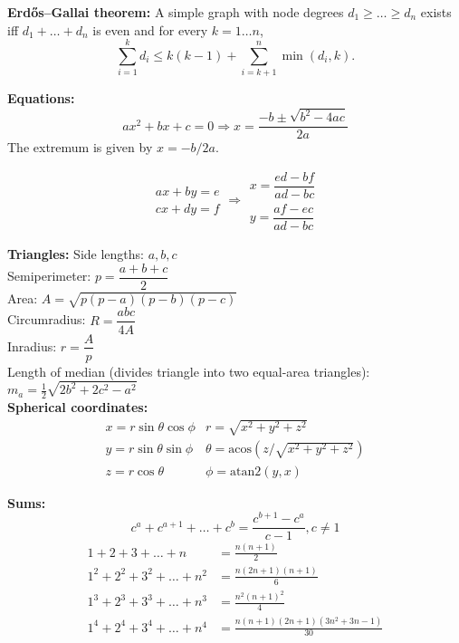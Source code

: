 \noindent
\textbf{Erdős–Gallai theorem:}
\noindent
A simple graph with node degrees $d_1 \ge \dots \ge d_n$ exists iff $d_1 + \dots + d_n$ is even and for every $k = 1\dots n$,
\[ \sum _{i=1}^{k}d_{i}\leq k(k-1)+\sum _{i=k+1}^{n}\min(d_{i},k). \]

\noindent
\textbf{Equations:}
\[ax^2+bx+c=0 \Rightarrow x = \frac{-b\pm\sqrt{b^2-4ac}}{2a}\]
\noindent
The extremum is given by $x = -b/2a$.

\[\begin{aligned}ax+by=e\\cx+dy=f\end{aligned}
\Rightarrow
\begin{aligned}x=\dfrac{ed-bf}{ad-bc}\\y=\dfrac{af-ec}{ad-bc}\end{aligned}\]

\noindent
\textbf{Triangles:}
\noindent
Side lengths: $a,b,c$\\
Semiperimeter: $p=\dfrac{a+b+c}{2}$\\
Area: $A=\sqrt{p(p-a)(p-b)(p-c)}$\\
Circumradius: $R=\dfrac{abc}{4A}$\\
Inradius: $r=\dfrac{A}{p}$\\
Length of median (divides triangle into two equal-area triangles): $m_a=\tfrac{1}{2}\sqrt{2b^2+2c^2-a^2}$\\

\noindent
\textbf{Spherical coordinates:}
\[\begin{array}{cc}
x = r\sin\theta\cos\phi & r = \sqrt{x^2+y^2+z^2}\\
y = r\sin\theta\sin\phi & \theta = \textrm{acos}(z/\sqrt{x^2+y^2+z^2})\\
z = r\cos\theta & \phi = \textrm{atan2}(y,x)
\end{array}\]

\noindent
\textbf{Sums:}
\[ c^a + c^{a+1} + \dots + c^{b} = \frac{c^{b+1} - c^a}{c-1}, c \neq 1 \]
\begin{align*}
	1 + 2 + 3 + \dots + n &= \frac{n(n+1)}{2} \\
	1^2 + 2^2 + 3^2 + \dots + n^2 &= \frac{n(2n+1)(n+1)}{6} \\
	1^3 + 2^3 + 3^3 + \dots + n^3 &= \frac{n^2(n+1)^2}{4} \\
	1^4 + 2^4 + 3^4 + \dots + n^4 &= \frac{n(n+1)(2n+1)(3n^2 + 3n - 1)}{30} \\
\end{align*}

